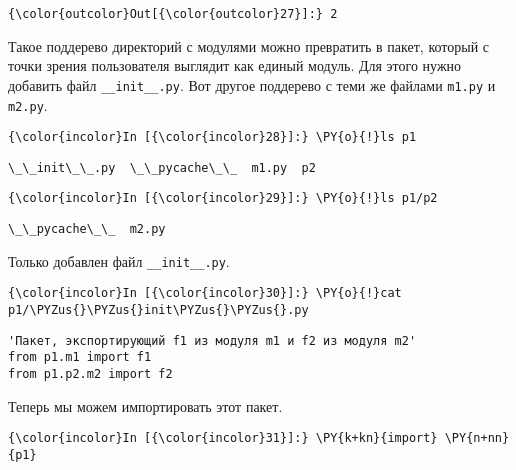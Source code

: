             \begin{Verbatim}[commandchars=\\\{\}]
{\color{outcolor}Out[{\color{outcolor}27}]:} 2
\end{Verbatim}
        
    Такое поддерево директорий с модулями можно превратить в пакет, который
с точки зрения пользователя выглядит как единый модуль. Для этого нужно
добавить файл \texttt{\_\_init\_\_.py}. Вот другое поддерево с теми же
файлами \texttt{m1.py} и \texttt{m2.py}.

    \begin{Verbatim}[commandchars=\\\{\}]
{\color{incolor}In [{\color{incolor}28}]:} \PY{o}{!}ls p1
\end{Verbatim}

    \begin{Verbatim}[commandchars=\\\{\}]
\_\_init\_\_.py  \_\_pycache\_\_  m1.py  p2

    \end{Verbatim}

    \begin{Verbatim}[commandchars=\\\{\}]
{\color{incolor}In [{\color{incolor}29}]:} \PY{o}{!}ls p1/p2
\end{Verbatim}

    \begin{Verbatim}[commandchars=\\\{\}]
\_\_pycache\_\_  m2.py

    \end{Verbatim}

    Только добавлен файл \texttt{\_\_init\_\_.py}.

    \begin{Verbatim}[commandchars=\\\{\}]
{\color{incolor}In [{\color{incolor}30}]:} \PY{o}{!}cat p1/\PYZus{}\PYZus{}init\PYZus{}\PYZus{}.py
\end{Verbatim}

    \begin{Verbatim}[commandchars=\\\{\}]
'Пакет, экспортирующий f1 из модуля m1 и f2 из модуля m2'
from p1.m1 import f1
from p1.p2.m2 import f2

    \end{Verbatim}

    Теперь мы можем импортировать этот пакет.

    \begin{Verbatim}[commandchars=\\\{\}]
{\color{incolor}In [{\color{incolor}31}]:} \PY{k+kn}{import} \PY{n+nn}{p1}
\end{Verbatim}

